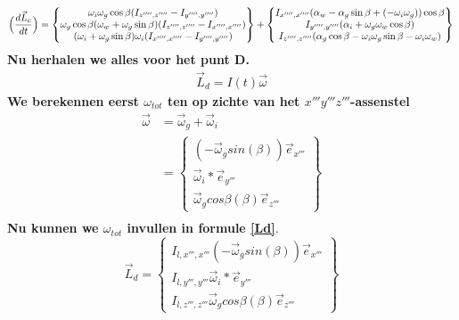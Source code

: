 \documentclass[a4paper,10pt]{article}
\begin{document}
\begin{equation}
\Big(\dfrac{d\vec{L}_c}{dt}\Big) = \begin{Bmatrix}
\omega_i\omega_g\cos{\beta}(I_{z'''',z''''}-I_{y'''',y''''})\\
\omega_g\cos{\beta}(\omega_w + \omega_g\sin{\beta})(I_{z'''',z''''}-I_{x'''',x''''})\\
(\omega_i + \omega_g \sin{\beta})\omega_i( I_{x'''',x''''}-I_{y'''',y''''})
\end{Bmatrix}
+ \begin{Bmatrix}
I_{x'''',x''''}(\alpha_w - \alpha_g \sin{\beta}+ (-\omega_i\omega_g))\cos{\beta}\\
I_{y'''',y''''}(\alpha_i + \omega_g\omega_w\cos{\beta})\\
I_{z'''',z''''}(\alpha_g\cos{\beta}- \omega_i\omega_g\sin{\beta}-\omega_i\omega_w)
\end{Bmatrix}\\
\end{equation}
\textbf{Nu herhalen we alles voor het punt D.}
\begin{equation}
\label{Ld}
\begin{aligned}
\vec{L}_d = I(t)\vec{\omega}
\end{aligned}
\end{equation}
\textbf{We berekennen eerst $\omega_{tot}$ ten op zichte van het $x'''y'''z'''$-assenstel}
\begin{equation}
\begin{aligned}
\vec{\omega} &=  \vec{\omega}_g + \vec{\omega}_i\\
&= \begin{Bmatrix}
( -\vec{\omega}_g sin(\beta))\vec{e}_{x'''}\\
\vec{\omega}_i*\vec{e}_{y'''}\\
\vec{\omega}_g cos{\beta}(\beta)\vec{e}_{z'''}
\end{Bmatrix}\\
\end{aligned}
\end{equation}
\textbf{Nu kunnen we $\omega_{tot}$ invullen in formule \eqref{Ld}}.
\begin{equation}
\vec{L}_d=\begin{Bmatrix}
I_{l,x''',x'''} ( -\vec{\omega}_g sin(\beta))\vec{e}_{x'''}\\
I_{l,y''',y'''}\vec{\omega}_i*\vec{e}_{y'''}\\
I_{l,z''',z'''}\vec{\omega}_g cos{\beta}(\beta)\vec{e}_{z'''}
\end{Bmatrix}
\end{equation}
\end{document}
